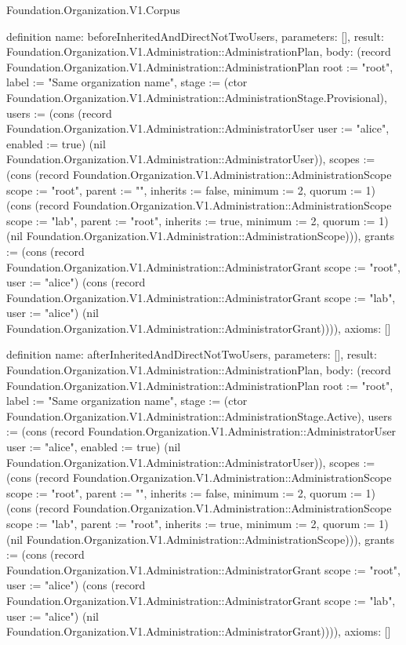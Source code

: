 \begin{lexlean}{Foundation.Organization.V1.Corpus}
\begin{semanticmodule}
definition{
  name: beforeInheritedAndDirectNotTwoUsers,
  parameters: [],
  result: Foundation.Organization.V1.Administration::AdministrationPlan,
  body: (record Foundation.Organization.V1.Administration::AdministrationPlan {root := "root", label := "Same organization name", stage := (ctor Foundation.Organization.V1.Administration::AdministrationStage.Provisional), users := (cons (record Foundation.Organization.V1.Administration::AdministratorUser {user := "alice", enabled := true}) (nil Foundation.Organization.V1.Administration::AdministratorUser)), scopes := (cons (record Foundation.Organization.V1.Administration::AdministrationScope {scope := "root", parent := "", inherits := false, minimum := 2, quorum := 1}) (cons (record Foundation.Organization.V1.Administration::AdministrationScope {scope := "lab", parent := "root", inherits := true, minimum := 2, quorum := 1}) (nil Foundation.Organization.V1.Administration::AdministrationScope))), grants := (cons (record Foundation.Organization.V1.Administration::AdministratorGrant {scope := "root", user := "alice"}) (cons (record Foundation.Organization.V1.Administration::AdministratorGrant {scope := "lab", user := "alice"}) (nil Foundation.Organization.V1.Administration::AdministratorGrant)))}),
  axioms: []
}

definition{
  name: afterInheritedAndDirectNotTwoUsers,
  parameters: [],
  result: Foundation.Organization.V1.Administration::AdministrationPlan,
  body: (record Foundation.Organization.V1.Administration::AdministrationPlan {root := "root", label := "Same organization name", stage := (ctor Foundation.Organization.V1.Administration::AdministrationStage.Active), users := (cons (record Foundation.Organization.V1.Administration::AdministratorUser {user := "alice", enabled := true}) (nil Foundation.Organization.V1.Administration::AdministratorUser)), scopes := (cons (record Foundation.Organization.V1.Administration::AdministrationScope {scope := "root", parent := "", inherits := false, minimum := 2, quorum := 1}) (cons (record Foundation.Organization.V1.Administration::AdministrationScope {scope := "lab", parent := "root", inherits := true, minimum := 2, quorum := 1}) (nil Foundation.Organization.V1.Administration::AdministrationScope))), grants := (cons (record Foundation.Organization.V1.Administration::AdministratorGrant {scope := "root", user := "alice"}) (cons (record Foundation.Organization.V1.Administration::AdministratorGrant {scope := "lab", user := "alice"}) (nil Foundation.Organization.V1.Administration::AdministratorGrant)))}),
  axioms: []
}


\end{semanticmodule}
\end{lexlean}
